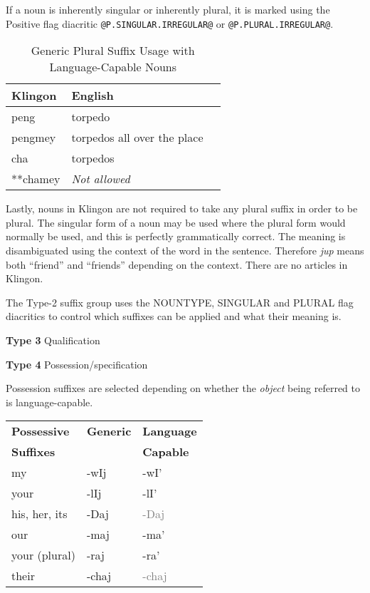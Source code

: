 \documentclass[11pt]{article}
\begin{document}
If a noun is inherently singular or inherently plural, it is marked using the Positive flag diacritic \texttt{@P.SINGULAR.IRREGULAR@} or \texttt{@P.PLURAL.IRREGULAR@}.
	
	\begin{table}[h]
	\begin{center}
	\begin{tabular}{lll}
	\toprule
	\bf Klingon & \bf English \\
	\midrule
	peng & torpedo \\
	pengmey & torpedos all over the place \\
	cha & torpedos \\
	**chamey & \it Not allowed \\
	\bottomrule
	\end{tabular}
	\end{center}
	\caption{Generic Plural Suffix Usage with Language-Capable Nouns}
	\end{table}

Lastly, nouns in Klingon are not required to take any plural suffix in order to be plural. The singular form of a noun may be used where the plural form would normally be used, and this is perfectly grammatically correct. The meaning is disambiguated using the context of the word in the sentence. Therefore \textit{jup} means both ``friend'' and ``friends'' depending on the context. There are no articles in Klingon.
	
The Type-2 suffix group uses the NOUNTYPE, SINGULAR and PLURAL flag diacritics to control which suffixes can be applied and what their meaning is.

\textbf{Type 3} Qualification
	
\textbf{Type 4} Possession/specification
	
Possession suffixes are selected depending on whether the \textit{object} being referred to is language-capable.

	\begin{center}
	\begin{tabular}{lll}
	\toprule
	\bf{Possessive} & \bf{Generic} & \bf{Language} \\
	\bf{Suffixes} & & \bf{Capable} \\
	\midrule
	my & -wIj & -wI' \\ \hline
	your & -lIj & -lI' \\ \hline
	his, her, its & -Daj & \textcolor{gray}{-Daj} \\ \hline
	our & -maj & -ma' \\ \hline
	your (plural) & -raj & -ra' \\ \hline
	their & -chaj & \textcolor{gray}{-chaj} \\
	\bottomrule
	\end{tabular}
	\end{center}
	
\end{document}
